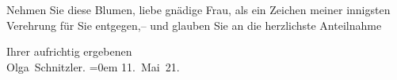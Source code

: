 \pstart
           Nehmen Sie diese Blumen, liebe gnädige Frau, als ein Zeichen meiner innigsten
               Verehrung für Sie entgegen,– und glauben Sie an die herzlichste Anteilnahme\pend
           
\pstart
           {\pb}Ihrer aufrichtig ergebenen{\\[\baselineskip]}\spacefill\mbox{Olga Schnitzler.}\pend
           \leftskip=0em{}
\pstart
           \noindent{}11. Mai 21.\pend
           \endnumbering{}  \newcommand{\dateiname}{L02367}\newcommand{\titel}{Olga Schnitzler an Anna Bahr-Mildenburg, 11. 5. 1921}\newcommand{\editorInnen}{Herausgegeben von Martin Anton Müller}
